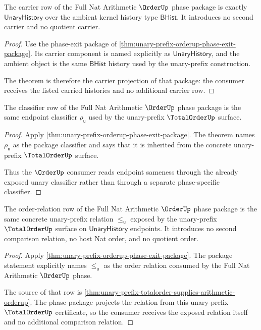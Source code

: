 \begin{theorem}
\label{thm:unary-prefix-orderup-carrier-obligation}
The carrier row of the Full Nat Arithmetic $\OrderUp$ phase package is exactly
$\mathsf{UnaryHistory}$ over the ambient kernel history type $\mathsf{BHist}$.
It introduces no second carrier and no quotient carrier.
\end{theorem}
\begin{proof}
Use the phase-exit package of
\autoref{thm:unary-prefix-orderup-phase-exit-package}. Its carrier component
is named explicitly as $\mathsf{UnaryHistory}$, and the ambient object is the
same $\mathsf{BHist}$ history used by the unary-prefix construction.

The theorem is therefore the carrier projection of that package: the consumer
receives the listed carried histories and no additional carrier row.
\end{proof}

\begin{theorem}
\label{thm:unary-prefix-orderup-classifier-obligation}
The classifier row of the Full Nat Arithmetic $\OrderUp$ phase package is the
same endpoint classifier $\rho_{\mathsf{u}}$ used by the unary-prefix
$\TotalOrderUp$ surface.
\end{theorem}
\begin{proof}
Apply \autoref{thm:unary-prefix-orderup-phase-exit-package}. The theorem names
$\rho_{\mathsf{u}}$ as the package classifier and says that it is inherited from
the concrete unary-prefix $\TotalOrderUp$ surface.

Thus the $\OrderUp$ consumer reads endpoint sameness through the already exposed
unary classifier rather than through a separate phase-specific classifier.
\end{proof}

\begin{theorem}
\label{thm:unary-prefix-orderup-relation-obligation}
The order-relation row of the Full Nat Arithmetic $\OrderUp$ phase package is
the same concrete unary-prefix relation $\le_{\mathsf{u}}$ exposed by the
unary-prefix $\TotalOrderUp$ surface on $\mathsf{UnaryHistory}$ endpoints. It
introduces no second comparison relation, no host Nat order, and no quotient
order.
\end{theorem}
\begin{proof}
Apply \autoref{thm:unary-prefix-orderup-phase-exit-package}. The package
statement explicitly names $\le_{\mathsf{u}}$ as the order relation consumed by
the Full Nat Arithmetic $\OrderUp$ phase.

The source of that row is
\autoref{thm:unary-prefix-totalorder-supplies-arithmetic-orderup}. The phase
package projects the relation from this unary-prefix $\TotalOrderUp$
certificate, so the consumer receives the exposed relation itself and no
additional comparison relation.
\end{proof}

